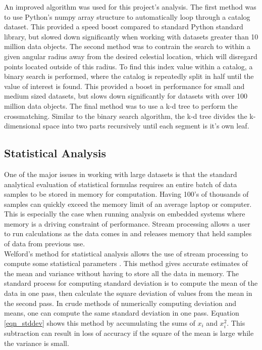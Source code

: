 \documentclass[11pt,sigconf]{acmart}
\begin{document}
An improved algorithm was used for this project's analysis. The first method was to
use Python's numpy array structure to automatically loop through a catalog dataset. This
provided a speed boost compared to standard Python standard library, but slowed down
significantly when working with datasets greater than 10 million data objects. The second
method was to contrain the search to within a given angular radius away from the desired
celestial location, which will disregard points located outside of this radius. To find
this index value within a catalog, a binary search is performed, where the catalog is 
repeatedly split in half until the value of interest is found. This provided a boost in
performance for small and medium sized datasets, but slows down significantly for datasets 
with over 100 million data objects. The final method was to use a k-d tree to perform
the crossmatching. Similar to the binary search algorithm, the k-d tree divides the 
k-dimensional space into two parts recursively until each segment is it's own leaf.  

\subsection{Statistical Analysis}
One of the major issues in working with large datasets is that the standard analytical
evaluation of statistical formulas requires an entire batch of data samples to
be stored in memory for computation. Having 100's of thousands of samples can
quickly exceed the memory limit of an average laptop or computer. This is especially
the case when running analysis on embedded systems where memory is a driving constraint
of performance. Stream processing allows a user to run calculations as the data comes in
and releases memory that held samples of data from previous use.
\\
Welford's method for statistical analysis allows the use of stream processing to
compute some statistical parameters \cite{welford}. This method gives accurate estimates of the 
mean and variance without having to store all the data in memory. The standard process for computing
standard deviation is to compute the mean of the data in one pass, then calculate the square
deviation of values from the mean in the second pass. In crude methods of numerically computing
deviation and means, one can compute the same standard deviation in one pass. Equation \ref{eqn_stddev} shows
this method by accumulating the sums of $x_i$ and $x_{i}^{2}$. This subtraction can result in 
loss of accuracy if the square of the mean is large while the variance is small.
\end{document}

